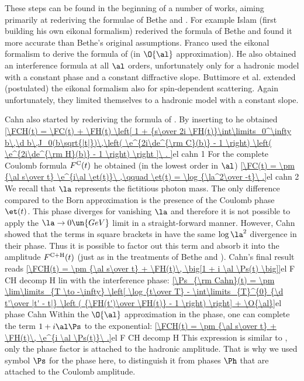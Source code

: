 These steps can be found in the beginning of a number of works, aiming primarily at rederiving the formulae of Bethe  and \WY{} .
  For example Islam  (first building his own eikonal formalism) rederived the formula of Bethe and found it more accurate than Bethe's original assumptions.
  Franco  used the eikonal formalism to derive the formula of \WY{} (in $\O{\al}$ approximation). He also obtained an interference formula at all $\al$ orders, unfortunately only for a hadronic model with a constant phase and a constant diffractive slope.
  Buttimore et al.  extended (postulated) the eikonal formalism also for spin-dependent scattering. Again unfortunately, they limited themselves to a hadronic model with a constant slope.

Cahn  also started by rederiving the formula of \WY. By inserting  to  he obtained
\eqref{\FCH(t) = \FC(t)
+ \FH(t) \left[ 1 +
{s\over 2i \FH(t)}\int\limits_0^\infty b\,\d b\,J_0(b\sqrt{|t|})\,\left( \e^{2i\de^{\rm C}(b)} - 1 \right) \left( \e^{2i\de^{\rm H}(b)} - 1 \right)
\right ]\ .
}{el cahn 1}
For the complete Coulomb formula $F^{\rm C}(t)$ he obtained (in the lowest order in $\al$)
\eqref{\FC(t) = \pm {\al s\over t} \e^{i\al \et(t)}\ ,\qquad \et(t) = \log {\la^2\over -t}\ .}{el cahn 2}
We recall that $\la$ represents the fictitious photon mass. The only difference compared to the Born approximation  is the presence of the Coulomb phase $\et(t)$. This phase diverges for vanishing $\la$ and therefore it is not possible to apply the $\la\to 0\un{GeV}$ limit in a straight-forward manner. However, Cahn showed that the terms in square brackets in  have the same $\log\la^2$ divergence in their phase. Thus it is possible to factor out this term and absorb it into the amplitude $F^{\rm C+H}(t)$ (just as in the treatments of Bethe and \WY). Cahn's final result reads
\eqref{\FCH(t) = \pm {\al s\over t} + \FH(t)\, \big[1 + i \al \Ps(t) \big]}{el F CH decomp H lin}
with the interference phase:
\eqref{\Ps_{\rm Cahn}(t) = \pm \lim\limits_{T \to -\infty} \left[ \log {t\over T} - \int\limits_{T}^{0} {\d t'\over |t' - t|} \left ( {\FH(t')\over \FH(t)} - 1 \right) \right] + \O{\al}}{el phase Cahn}
Within the $\O{\al}$ approximation in the phase, one can complete the term $1+i\al\Ps$ to the exponential:
\eqref{\FCH(t) = \pm {\al s\over t} + \FH(t)\, \e^{i \al \Ps(t)}\ .}{el F CH decomp H}
This expression is similar to , only the phase factor is attached to the hadronic amplitude. That is why we used symbol $\Ps$ for the phase here, to distinguish it from phases $\Ph$ that are attached to the Coulomb amplitude.


